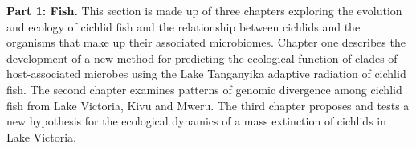 
\noindent\textbf{Part 1: Fish.} 
This section is made up of three chapters exploring the evolution and ecology of cichlid fish and the relationship between cichlids and the organisms that make up their associated microbiomes. Chapter one describes the development of a new method for predicting the ecological function of clades of host-associated microbes using the Lake Tanganyika adaptive radiation of cichlid fish. The second chapter examines patterns of genomic divergence among cichlid fish from Lake Victoria, Kivu and Mweru. \cite{mcgee2016evaluating} The third chapter proposes and tests a new hypothesis for the ecological dynamics of a mass extinction of cichlids in Lake Victoria. \cite{mcgee2015pharyngeal}

